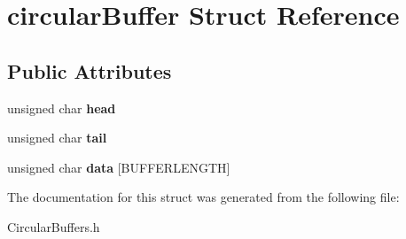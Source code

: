 \hypertarget{structcircular_buffer}{\section{circular\+Buffer Struct Reference}
\label{structcircular_buffer}
}
\subsection*{Public Attributes}
\begin{DoxyCompactItemize}
\item 
\hypertarget{structcircular_buffer_a409f0bfe51ee78c6079d02e1c91805b4}{unsigned char {\bfseries head}}\label{structcircular_buffer_a409f0bfe51ee78c6079d02e1c91805b4}

\item 
\hypertarget{structcircular_buffer_acd38209ec43493d0bad205958a0dc264}{unsigned char {\bfseries tail}}\label{structcircular_buffer_acd38209ec43493d0bad205958a0dc264}

\item 
\hypertarget{structcircular_buffer_a8e56ebe2b2b92b078f4a3fcd9fd82063}{unsigned char {\bfseries data} \mbox{[}B\+U\+F\+F\+E\+R\+L\+E\+N\+G\+T\+H\mbox{]}}\label{structcircular_buffer_a8e56ebe2b2b92b078f4a3fcd9fd82063}

\end{DoxyCompactItemize}


The documentation for this struct was generated from the following file\+:\begin{DoxyCompactItemize}
\item 
Circular\+Buffers.\+h\end{DoxyCompactItemize}
